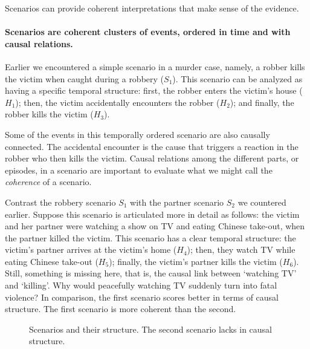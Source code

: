 \documentclass[10pt]{article}
\begin{document}

Scenarios can provide coherent interpretations that make sense of the evidence.
 
\paragraph{Scenarios are coherent clusters 
of events, ordered in time and with causal relations.} 
Earlier we encountered a simple scenario in a murder case, namely, 
a robber kills the victim when caught during a robbery ($S_1$). This scenario 
can be analyzed as having a specific 
temporal structure:
first, the robber enters the victim's house ($H_1$); then, the victim accidentally encounters the robber ($H_2$); and finally, 
the robber kills the victim ($H_3$). 

Some of the events in this temporally 
ordered scenario are also causally connected. %
The accidental encounter is the cause that triggers a reaction 
in the robber who then kills the victim. 
Causal relations among the different parts, or episodes, 
in a scenario are important to evaluate what we might 
call the \textit{coherence} of a scenario. 

Contrast the robbery scenario $S_1$
with the partner scenario $S_2$ we countered earlier.
Suppose this scenario is articulated more in detail as follows: 
the victim and her partner were watching a show on TV and eating Chinese take-out, 
when the partner killed the victim. 
This scenario has a clear temporal structure: the victim's partner arrives at the victim's home ($H_4$); then, 
they watch TV while eating Chinese take-out ($H_5$); finally, the victim's partner kills the victim ($H_6$). 
Still, something is missing here, that is, the causal link between `watching TV' and `killing'. Why would peacefully 
watching TV suddenly turn into fatal violence?
In comparison, the first scenario scores better in terms 
of causal structure. The first scenario 
is more coherent than the second. 


\begin{figure}[bt]
\centering

\caption{Scenarios and their structure\label{fig:scens}. 
The second scenario lacks in causal structure.}
\end{figure}
\end{document}
